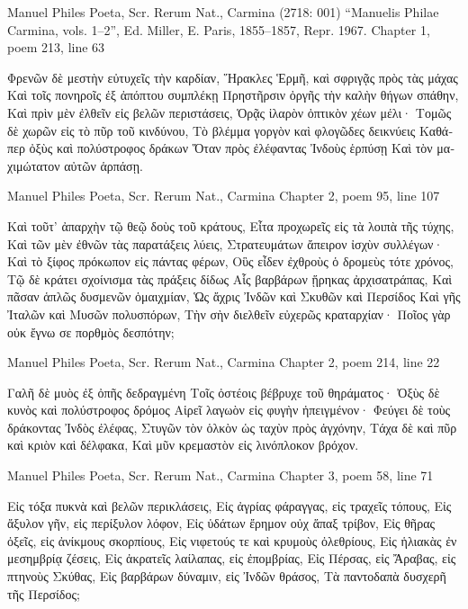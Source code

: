 \documentclass[12pt,letterpaper,twoside,final]{memoir}
\begin{document}
\begin{greek}
Manuel Philes Poeta, Scr. Rerum Nat., Carmina (2718: 001)
“Manuelis Philae Carmina, vols. 1–2”, Ed. Miller, E.
Paris, 1855–1857, Repr. 1967.
Chapter 1, poem 213, line 63

Φρενῶν δὲ μεστὴν εὐτυχεῖς τὴν καρδίαν, 
Ἥρακλες Ἑρμῆ, καὶ σφριγᾷς πρὸς τὰς μάχας 
Καὶ τοῖς πονηροῖς ἐξ ἀπόπτου συμπλέκῃ 
Πρηστῆρσιν ὀργῆς τὴν καλὴν θήγων σπάθην, 
Καὶ πρὶν μὲν ἐλθεῖν εἰς βελῶν περιστάσεις, 
Ὁρᾷς ἱλαρὸν ὀπτικὸν χέων μέλι· 
Τομῶς δὲ χωρῶν εἰς τὸ πῦρ τοῦ κινδύνου,   
Τὸ βλέμμα γοργὸν καὶ φλογῶδες δεικνύεις 
Καθάπερ ὀξὺς καὶ πολύστροφος δράκων 
Ὅταν πρὸς ἐλέφαντας Ἰνδοὺς ἑρπύσῃ 
Καὶ τὸν μαχιμώτατον αὐτῶν ἁρπάσῃ. 




Manuel Philes Poeta, Scr. Rerum Nat., Carmina 
Chapter 2, poem 95, line 107

Καὶ τοῦτ' ἀπαρχὴν τῷ θεῷ δοὺς τοῦ κράτους, 
Εἶτα προχωρεῖς εἰς τὰ λοιπὰ τῆς τύχης, 
Καὶ τῶν μὲν ἐθνῶν τὰς παρατάξεις λύεις, 
Στρατευμάτων ἄπειρον ἰσχὺν συλλέγων· 
Καὶ τὸ ξίφος πρόκωπον εἰς πάντας φέρων, 
Οὓς εἶδεν ἐχθροὺς ὁ δρομεὺς τότε χρόνος, 
Τῷ δὲ κράτει σχοίνισμα τὰς πράξεις δίδως 
Αἷς βαρβάρων ᾕρηκας ἀρχισατράπας, 
Καὶ πᾶσαν ἁπλῶς δυσμενῶν ὁμαιχμίαν, 
Ὡς ἄχρις Ἰνδῶν καὶ Σκυθῶν καὶ Περσίδος 
Καὶ γῆς Ἰταλῶν καὶ Μυσῶν πολυσπόρων, 
Τὴν σὴν διελθεῖν εὐχερῶς κραταρχίαν· 
Ποῖος γὰρ οὐκ ἔγνω σε πορθμὸς δεσπότην; 



Manuel Philes Poeta, Scr. Rerum Nat., Carmina 
Chapter 2, poem 214, line 22

Γαλῆ δὲ μυὸς ἐξ ὀπῆς δεδραγμένη 
Τοῖς ὀστέοις βέβρυχε τοῦ θηράματος· 
Ὀξὺς δὲ κυνὸς καὶ πολύστροφος δρόμος 
Αἱρεῖ λαγωὸν εἰς φυγὴν ἠπειγμένον· 
Φεύγει δὲ τοὺς δράκοντας Ἰνδὸς ἐλέφας,   
Στυγῶν τὸν ὁλκὸν ὡς ταχὺν πρὸς ἀγχόνην, 
Τάχα δὲ καὶ πῦρ καὶ κριὸν καὶ δέλφακα, 
Καὶ μῦν κρεμαστὸν εἰς λινόπλοκον βρόχον. 



Manuel Philes Poeta, Scr. Rerum Nat., Carmina 
Chapter 3, poem 58, line 71

Εἰς τόξα πυκνὰ καὶ βελῶν περικλάσεις, 
Εἰς ἀγρίας φάραγγας, εἰς τραχεῖς τόπους, 
Εἰς ἄξυλον γῆν, εἰς περίξυλον λόφον, 
Εἰς ὑδάτων ἔρημον οὐχ ἅπαξ τρίβον, 
Εἰς θῆρας ὀξεῖς, εἰς ἀνίκμους σκορπίους, 
Εἰς νιφετούς τε καὶ κρυμοὺς ὀλεθρίους, 
Εἰς ἡλιακὰς ἐν μεσημβρίᾳ ζέσεις, 
Εἰς ἀκρατεῖς λαίλαπας, εἰς ἐπομβρίας, 
Εἰς Πέρσας, εἰς Ἄραβας, εἰς πτηνοὺς Σκύθας, 
Εἰς βαρβάρων δύναμιν, εἰς Ἰνδῶν θράσος, 
Τὰ παντοδαπὰ δυσχερῆ τῆς Περσίδος; 

\end{greek}
\end{document}
